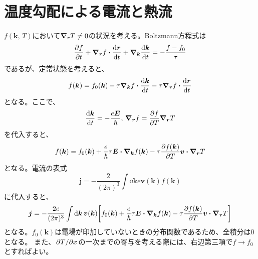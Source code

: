 \documentclass[a4paper,5pt,uplatex]{jsarticle}
\theoremstyle{mystyle} %
\begin{document}
\section{温度勾配による電流と熱流}
$f(\bm{k},\,T)$において$\grad_{r}T\neq 0$の状況を考える。Boltzmann方程式は
\begin{equation}
	\pdv{f}{t} + \grad_{\bm{r}}f\vdot\dv{\bm{r}}{t} + \grad_{\bm{k}}\dv{\bm{k}}{t} = -\frac{f-f_0}{\tau}
\end{equation}
であるが、定常状態を考えると、
\begin{equation}
	f(\bm{k}) = f_0(\bm{k}) - \tau\grad_{\bm{k}}f\vdot\dv{\bm{k}}{t} - \tau\grad_{\bm{r}}f\vdot\dv{\bm{r}}{t}
\end{equation}
となる。ここで、
\begin{equation}
	\dv{\bm{k}}{t} = -\frac{e\bm{E}}{\hbar},\,\grad_{\bm{r}}f = \pdv{f}{T}\grad_{\bm{r}}T
\end{equation}
を代入すると、
\begin{equation}
	f(\bm{k}) = f_0(\bm{k}) + \frac{e}{\hbar}\tau\bm{E}\vdot\grad_{\bm{k}}f(\bm{k}) - \tau\pdv{f(\bm{k})}{T}\bm{v}\vdot\grad_{\bm{r}}T
\end{equation}
となる。電流の表式
\begin{equation}
	\bm{j} = -\frac{2}{(2\pi)^3}\int\dd{\bm{k}}e\bm{v}(\bm{k})f(\bm{k})
\end{equation}
に代入すると、
\begin{equation}
	\bm{j} = -\frac{2e}{(2\pi)^3}\int\dd{\bm{k}}\bm{v}(\bm{k})\qty[f_0(\bm{k}) + \frac{e}{\hbar}\tau\bm{E}\vdot\grad_{\bm{k}}f(\bm{k}) - \tau\pdv{f(\bm{k})}{T}\bm{v}\vdot\grad_{\bm{r}}T]
\end{equation}
となる。$f_0(\bm{k})$は電場が印加していないときの分布関数であるため、全積分は$0$となる。
また、$\pdv*{T}{x}$の一次までの寄与を考える際には、右辺第三項で$f\to{}f_0$とすればよい。
\end{document}
